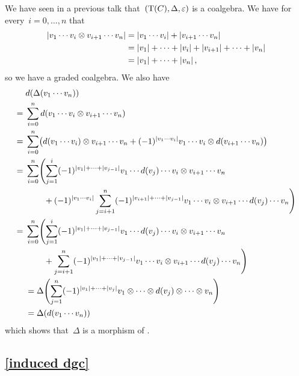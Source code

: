 We have seen in a previous talk that~$(\operatorname{T}(C), \Delta, \varepsilon)$ is a coalgebra.
We have for every~$i = 0, \dotsc, n$ that
\begin{align*}
  \lvert v_1 \dotsm v_i \otimes v_{i+1} \dotsm v_n\rvert
  &=
  \lvert v_1 \dotsm v_i\rvert + \lvert v_{i+1} \dotsm v_n\rvert
  \\
  &=
  \lvert v_1\rvert + \dotsb + \lvert v_i\rvert + \lvert v_{i+1}\rvert + \dotsb + \lvert v_n\rvert
  \\
  &=
  \lvert v_1\rvert + \dotsb + \lvert v_n\rvert  \,,
\end{align*}
so we have a graded coalgebra.
We also have
\begingroup
\allowdisplaybreaks
\begin{align*}
  {}&
  d(\Delta(v_1 \dotsm v_n))
  \\
  ={}&
  \sum_{i=0}^n d(v_1 \dotsm v_i \tensor v_{i+1} \dotsm v_n)
  \\
  ={}&
  \sum_{i=0}^n
  \bigl(
      d(v_1 \dotsm v_i) \tensor v_{i+1} \dotsm v_n
    + (-1)^{\hdeg{v_1 \dotsm v_i}}
      v_1 \dotsm v_i \tensor d(v_{i+1} \dotsm v_n)
  \bigr)
  \\
  ={}&
  \sum_{i=0}^n
  \Biggl(
    \sum_{j=1}^i
    (-1)^{\hdeg{v_1} + \dotsb + \hdeg{v_{j-1}}}
    v_1 \dotsm d(v_j) \dotsm v_i \tensor v_{i+1} \dotsm v_n
  \\
  {}&
  \phantom{\sum_{i=0}^n \biggl(}
  + (-1)^{\hdeg{v_1 \dotsm v_i}}
  \sum_{j=i+1}^n
  (-1)^{\hdeg{v_{i+1}} + \dotsb + \hdeg{v_{j-1}}}
  v_1 \dotsm v_i \tensor v_{i+1} \dotsm d(v_j) \dotsm v_n
  \Biggl)
  \\
  ={}&
  \sum_{i=0}^n
  \Biggl(
    \sum_{j=1}^i
    (-1)^{\hdeg{v_1} + \dotsb + \hdeg{v_{j-1}}}
    v_1 \dotsm d(v_j) \dotsm v_i \tensor v_{i+1} \dotsm v_n
  \\
  {}&
  \phantom{\sum_{i=0}^n \biggl(}
  + \sum_{j=i+1}^n
  (-1)^{\hdeg{v_1} + \dotsb + \hdeg{v_{j-1}}}
  v_1 \dotsm v_i \tensor v_{i+1} \dotsm d(v_j) \dotsm v_n
  \Biggl)
  \\
  &=
  \Delta
  \Biggl(
    \sum_{j=1}^n
     (-1)^{\hdeg{v_1} + \dotsb + \hdeg{v_j}}
     v_1 \tensor \dotsm \tensor d(v_j) \tensor \dotsb \tensor v_n
  \Biggr)
  \\
  &=
  \Delta(d(v_1 \dotsm v_n))
\end{align*}
\endgroup
which shows that~$\Delta$ is a morphism of {\dgvs}.


\subsection{\cref{induced dgc}}
\label{induced dgc proof}


